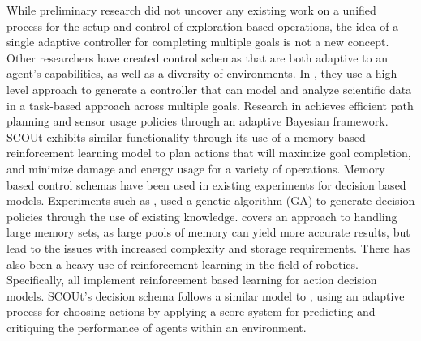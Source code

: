 While preliminary research did not uncover any existing work on a unified process for the setup and control of exploration based operations, the idea of a single adaptive controller for completing multiple goals is not a new concept.
Other researchers \cite{arora_approach_2017, hutter_online_2018} have created control schemas that are both adaptive to an agent's capabilities, as well as a diversity of environments.
In \cite{arora_approach_2017}, they use a high level approach to generate a controller that can model and analyze scientific data in a task-based approach across multiple goals.
Research in \cite{hutter_online_2018} achieves efficient path planning and sensor usage policies through an adaptive Bayesian framework.
SCOUt exhibits similar functionality through its use of a memory-based reinforcement learning model to plan actions that will maximize goal completion, and minimize damage and energy usage for a variety of operations.
Memory based control schemas have been used in existing experiments for decision based models.
Experiments such as \cite{fu_genetic_2003, yi_new_2011}, used a genetic algorithm (GA) to generate decision policies through the use of existing knowledge.
\cite{arulkumaran_brief_2017} covers an approach to handling large memory sets, as large pools of memory can yield more accurate results, but lead to the issues with increased complexity and storage requirements.
There has also been a heavy use of reinforcement learning in the field of robotics.
Specifically, \cite{arulkumaran_brief_2017, bai_toward_2017, kiumarsi_optimal_2018} all implement reinforcement based learning for action decision models.
SCOUt's decision schema follows a similar model to \cite{kiumarsi_optimal_2018}, using an adaptive process for choosing actions by applying a score system for predicting and critiquing the performance of agents within an environment.
